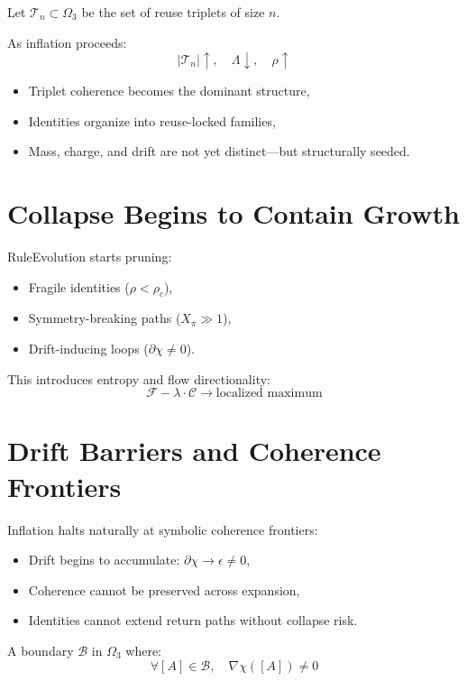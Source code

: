 Let $\mathcal{T}_n \subset \Omega_3$ be the set of reuse triplets of size $n$.

As inflation proceeds:
\[
|\mathcal{T}_n| \uparrow,\quad \Lambda \downarrow,\quad \rho \uparrow
\]

\begin{itemize}
  \item Triplet coherence becomes the dominant structure,
  \item Identities organize into reuse-locked families,
  \item Mass, charge, and drift are not yet distinct—but structurally seeded.
\end{itemize}

\section{Collapse Begins to Contain Growth} \label{sec:collapse-checks-growth}

RuleEvolution starts pruning:
\begin{itemize}
  \item Fragile identities ($\rho < \rho_c$),
  \item Symmetry-breaking paths ($X_\pi \gg 1$),
  \item Drift-inducing loops ($\partial\chi \ne 0$).
\end{itemize}

This introduces entropy and flow directionality:
\[
\mathcal{F} - \lambda \cdot \mathcal{C} \to \text{localized maximum}
\]

\section{Drift Barriers and Coherence Frontiers} \label{sec:drift-barriers}

Inflation halts naturally at symbolic coherence frontiers:
\begin{itemize}
  \item Drift begins to accumulate: $\partial\chi \to \epsilon \ne 0$,
  \item Coherence cannot be preserved across expansion,
  \item Identities cannot extend return paths without collapse risk.
\end{itemize}

\begin{definition}
A boundary $\mathcal{B}$ in $\Omega_3$ where:
\[
\forall [A] \in \mathcal{B},\quad \nabla\chi([A]) \ne 0
\]
\end{definition}

